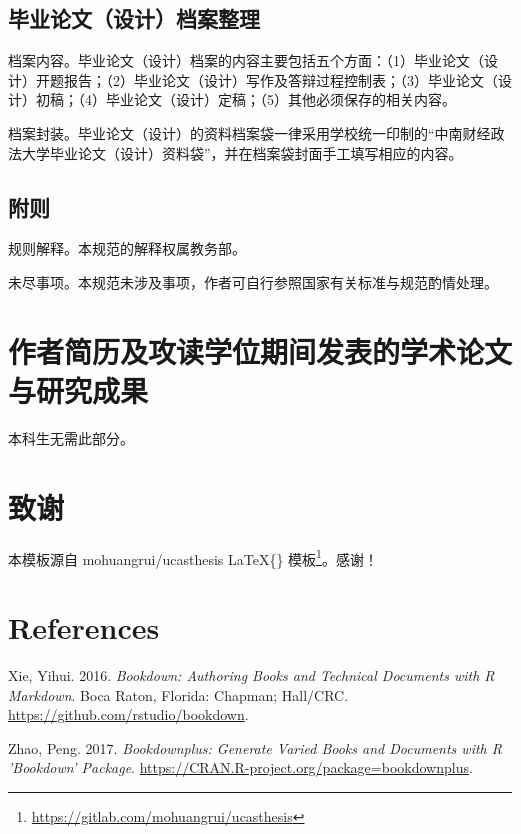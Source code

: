\documentclass[singlesided]{Style/ucasthesis}%
\begin{document}
\hypertarget{section-34}{%
\section{毕业论文（设计）档案整理}\label{section-34}}

档案内容。毕业论文（设计）档案的内容主要包括五个方面：（1）毕业论文（设计）开题报告；（2）毕业论文（设计）写作及答辩过程控制表；（3）毕业论文（设计）初稿；（4）毕业论文（设计）定稿；（5）其他必须保存的相关内容。

档案封装。毕业论文（设计）的资料档案袋一律采用学校统一印制的``中南财经政法大学毕业论文（设计）资料袋''，并在档案袋封面手工填写相应的内容。

\hypertarget{section-35}{%
\section{附则}\label{section-35}}

规则解释。本规范的解释权属教务部。

未尽事项。本规范未涉及事项，作者可自行参照国家有关标准与规范酌情处理。

\flushbottom

\backmatter

\hypertarget{section-36}{%
\chapter{作者简历及攻读学位期间发表的学术论文与研究成果}\label{section-36}}

本科生无需此部分。

\hypertarget{section-37}{%
\chapter{致谢}\label{section-37}}

本模板源自 mohuangrui/ucasthesis \LaTeX\{\} 模板\footnote{\url{https://gitlab.com/mohuangrui/ucasthesis}}。感谢！

\backmatter

\hypertarget{references}{%
\chapter*{References}\label{references}}



\hypertarget{refs}{}
\leavevmode\hypertarget{ref-R-bookdown}{}%
Xie, Yihui. 2016. \emph{Bookdown: Authoring Books and Technical Documents with R Markdown}. Boca Raton, Florida: Chapman; Hall/CRC. \url{https://github.com/rstudio/bookdown}.

\leavevmode\hypertarget{ref-R-bookdownplus}{}%
Zhao, Peng. 2017. \emph{Bookdownplus: Generate Varied Books and Documents with R 'Bookdown' Package}. \url{https://CRAN.R-project.org/package=bookdownplus}.
\end{document}
